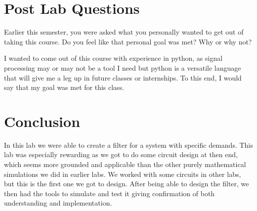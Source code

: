 \documentclass[12pt,a4paper]{article}
\begin{document}
\section*{Post Lab Questions}
Earlier this semester, you were asked what you personally wanted to get out of taking this
course. Do you feel like that personal goal was met? Why or why not?\vspace{12pt}

I wanted to come out of this course with experience in python, as signal processing may or may not be a tool I need but python is a versatile language that will give me a leg up in future classes or internships. To this end, I would say that my goal was met for this class. 
\section*{Conclusion}
In this lab we were able to create a filter for a system with specific demands. This lab was especially rewarding as we got to do some circuit design at then end, which seems more grounded and applicable than the other purely mathematical simulations we did in earlier labs. We worked with some circuits in other labs, but this is the first one we got to design. After being able to design the filter, we then had the tools to simulate and test it giving confirmation of both understanding and implementation. 
	
\end{document}
